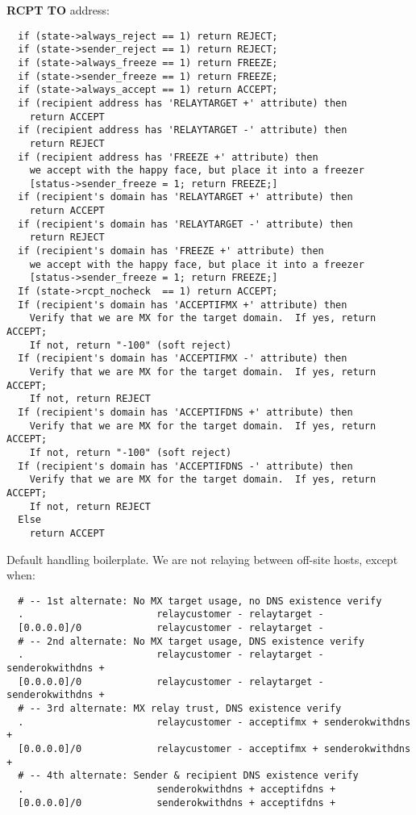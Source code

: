 {\bf RCPT TO} address:

\begin{verbatim}
  if (state->always_reject == 1) return REJECT;
  if (state->sender_reject == 1) return REJECT;
  if (state->always_freeze == 1) return FREEZE;
  if (state->sender_freeze == 1) return FREEZE;
  if (state->always_accept == 1) return ACCEPT;
  if (recipient address has 'RELAYTARGET +' attribute) then
    return ACCEPT
  if (recipient address has 'RELAYTARGET -' attribute) then
    return REJECT
  if (recipient address has 'FREEZE +' attribute) then
    we accept with the happy face, but place it into a freezer
    [status->sender_freeze = 1; return FREEZE;]
  if (recipient's domain has 'RELAYTARGET +' attribute) then
    return ACCEPT
  if (recipient's domain has 'RELAYTARGET -' attribute) then
    return REJECT
  if (recipient's domain has 'FREEZE +' attribute) then
    we accept with the happy face, but place it into a freezer
    [status->sender_freeze = 1; return FREEZE;]
  If (state->rcpt_nocheck  == 1) return ACCEPT;
  If (recipient's domain has 'ACCEPTIFMX +' attribute) then
    Verify that we are MX for the target domain.  If yes, return ACCEPT;
    If not, return "-100" (soft reject)
  If (recipient's domain has 'ACCEPTIFMX -' attribute) then
    Verify that we are MX for the target domain.  If yes, return ACCEPT;
    If not, return REJECT
  If (recipient's domain has 'ACCEPTIFDNS +' attribute) then
    Verify that we are MX for the target domain.  If yes, return ACCEPT;
    If not, return "-100" (soft reject)
  If (recipient's domain has 'ACCEPTIFDNS -' attribute) then
    Verify that we are MX for the target domain.  If yes, return ACCEPT;
    If not, return REJECT
  Else
    return ACCEPT
\end{verbatim}


Default handling boilerplate. We are not relaying between off-site hosts, 
except when:

\begin{verbatim}
  # -- 1st alternate: No MX target usage, no DNS existence verify
  .                       relaycustomer - relaytarget -
  [0.0.0.0]/0             relaycustomer - relaytarget -
  # -- 2nd alternate: No MX target usage, DNS existence verify
  .                       relaycustomer - relaytarget - senderokwithdns +
  [0.0.0.0]/0             relaycustomer - relaytarget - senderokwithdns +
  # -- 3rd alternate: MX relay trust, DNS existence verify
  .                       relaycustomer - acceptifmx + senderokwithdns +
  [0.0.0.0]/0             relaycustomer - acceptifmx + senderokwithdns +
  # -- 4th alternate: Sender & recipient DNS existence verify
  .                       senderokwithdns + acceptifdns +
  [0.0.0.0]/0             senderokwithdns + acceptifdns +
\end{verbatim}


